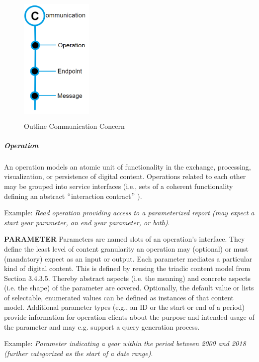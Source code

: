 \begin{figure}[H]
	\begin{Center}
		\includegraphics[width=1.36in,height=2.5in]{./media/image39.png}
		\caption{Outline Communication Concern}
		\label{fig:outline_communication_concern}
	\end{Center}
\end{figure}



\subparagraph*{Operation}
An operation models an atomic unit of functionality in the exchange, processing, visualization, or persistence of digital content. Operations related to each other may be grouped into service interfaces (i.e., sets of a coherent functionality defining an abstract $``$interaction contract$"$ ). 

Example: \textit{Read operation providing access to a parameterized report (may expect a start year parameter, an end year parameter, or both)}. 

\textbf{PARAMETER} Parameters are named slots of an operation’s interface. They define the least level of content granularity an operation may (optional) or must (mandatory) expect as an input or output. Each parameter mediates a particular kind of digital content. This is defined by reusing the triadic content model from Section 3.4.3.5. Thereby abstract aspects (i.e. the meaning) and concrete aspects (i.e. the shape) of the parameter are covered. Optionally, the default value or lists of selectable, enumerated values can be defined as instances of that content model. Additional parameter types (e.g., an ID or the start or end of a period) provide information for operation clients about the purpose and intended usage of the parameter and may e.g. support a query generation process. 

Example: \textit{Parameter indicating a year within the period between 2000 and 2018 (further categorized as the start of a date range)}. 

